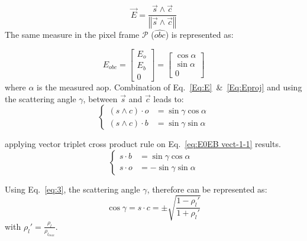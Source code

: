 \begin{equation}
\vec{E}=\frac{\vec{s}\wedge \vec{c}}{\left\Vert \vec{s}\wedge
    \vec{c}\right\Vert }
\label{Eq:E}
\end{equation}
The same measure in the pixel frame $\mathcal{P}$ ($\widehat{obc}$) is represented as:

\begin{equation}
E_{obc}=\left[\begin{array}{l}
E_{o}\\
E_{b}\\
0
\end{array}\right]=\left[\begin{array}{l}
\cos\alpha\\
\sin\alpha\\
0
\end{array}\right]
\label{Eq:Eproj}
\end{equation}
\noindent where $\alpha$ is the measured \gls{aop}.
Combination of Eq.~\ref{Eq:E}~\&~\ref{Eq:Eproj} and using the
scattering angle $\gamma$, between $\vec{s}$ and $\vec{c}$ leads to:
\begin{equation}
  \begin{cases}
(s\wedge c)\cdot o & =\sin\gamma\cos\alpha\\
(s\wedge c)\cdot b & =\sin\gamma\sin\alpha
\end{cases}
\label{eq:E0EB vect-1-1}
\end{equation}

\noindent applying vector triplet cross product rule on Eq.~\ref{eq:E0EB
  vect-1-1} results.
\begin{equation}
\begin{cases}
s\cdot b & =\sin\gamma\cos\alpha\\
s\cdot o & =-\sin\gamma\sin\alpha
\end{cases}
\label{eq:scal-b-o}
\end{equation}

Using Eq.~\ref{eq:3}, the scattering angle $\gamma$, therefore can be
represented as:
\begin{equation}
\cos\gamma=s\cdot c=\pm\sqrt{\frac{1-\rho_{l}'}{1+\rho_{l}'}}
\label{Eq:cosg}
\end{equation}
\noindent with $\rho_{l}'=\frac{\rho_{l}}{\rho_{l_{max}}}.$ \\
\vspace{0.4mm}

